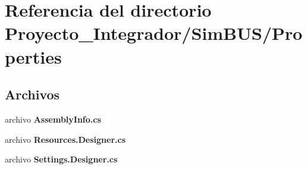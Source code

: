 \section{Referencia del directorio Proyecto\-\_\-\-Integrador/\-Sim\-B\-U\-S/\-Properties}
\label{dir_78dfcda71095974dba25725367cb32ed}
\subsection*{Archivos}
\begin{DoxyCompactItemize}
\item 
archivo {\bf Assembly\-Info.\-cs}
\item 
archivo {\bf Resources.\-Designer.\-cs}
\item 
archivo {\bf Settings.\-Designer.\-cs}
\end{DoxyCompactItemize}
